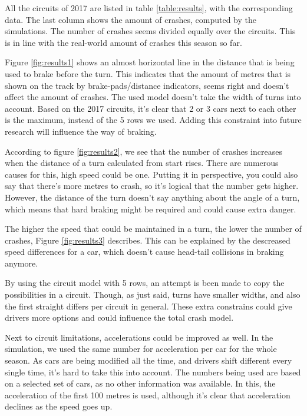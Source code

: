 All the circuits of 2017 are listed in table \ref{table:results}, with the corresponding data. The last column shows the amount of crashes, computed by the simulations. The number of crashes seems divided equally over the circuits. This is in line with the real-world amount of crashes this season so far.

Figure \ref{fig:results1} shows an almost horizontal line in the distance that is being used to brake before the turn. This indicates that the amount of metres that is shown on the track by brake-pads/distance indicators, seems right and doesn't affect the amount of crashes. The used model doesn't take the width of turns into account. Based on the 2017 circuits, it's clear that 2 or 3 cars next to each other is the maximum, instead of the 5 rows we used. Adding this constraint into future research will influence the way of braking.

According to figure \ref{fig:results2}, we see that the number of crashes increases when the distance of a turn calculated from start rises. There are numerous causes for this, high speed could be one. Putting it in perspective, you could also say that there's more metres to crash, so it's logical that the number gets higher. However, the distance of the turn doesn't say anything about the angle of a turn, which means that hard braking might be required and could cause extra danger.

The higher the speed that could be maintained in a turn, the lower the number of crashes, Figure \ref{fig:results3} describes. This can be explained by the descreased speed differences for a car, which doesn't cause head-tail collisions in braking anymore.

By using the circuit model with 5 rows, an attempt is been made to copy the possibilities in a circuit. Though, as just said, turns have smaller widths, and also the first straight differs per circuit in general. These extra constrains could give drivers more options and could influence the total crash model.

Next to circuit limitations, accelerations could be improved as well. In the simulation, we used the same number for acceleration per car for the whole season. As cars are being modified all the time, and drivers shift different every single time, it's hard to take this into account. The numbers being used are based on a selected set of cars, as no other information was available. In this, the acceleration of the first 100 metres is used, although it's clear that acceleration declines as the speed goes up.

